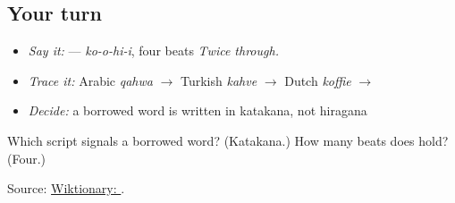 \subsection*{Your turn}
\begin{itemize}
\raggedright
  \item \emph{Say it:} \textbf{} — \emph{ko-o-hi-i}, four beats \emph{Twice through.}
  \item \emph{Trace it:} Arabic \emph{qahwa} $\to$ Turkish \emph{kahve} $\to$ Dutch \emph{koffie} $\to$ \textbf{}
  \item \emph{Decide:} a borrowed word is written in katakana, not hiragana
\end{itemize}

\begin{tcolorbox}[breakable,colback=teal!4,colframe=teal!35!black,title={Before you move on}]
Which script signals a borrowed word? (Katakana.) How many beats does \textbf{} hold? (Four.)

Source: \href{https://en.wiktionary.org/wiki/\%E3\%82\%B3\%E3\%83\%BC\%E3\%83\%92\%E3\%83\%BC}{Wiktionary: }.
\end{tcolorbox}
